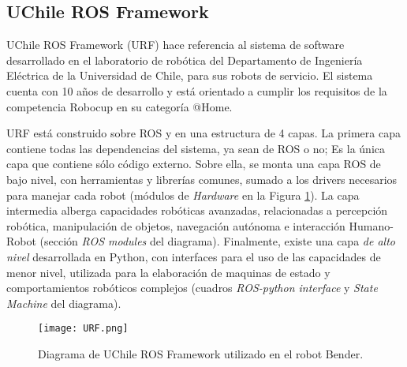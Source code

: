 \subsection{UChile ROS Framework}

UChile ROS Framework (URF) hace referencia al sistema de software desarrollado en el laboratorio de robótica del Departamento de Ingeniería Eléctrica de la Universidad de Chile, para sus robots de servicio. El sistema cuenta con 10 años de desarrollo y está orientado a cumplir los requisitos de la competencia Robocup en su categoría @Home.

URF está construido sobre ROS y en una estructura de 4 capas. La primera capa contiene todas las dependencias del sistema, ya sean de ROS o no; Es la única capa que contiene sólo código externo. Sobre ella, se monta una capa ROS de bajo nivel, con herramientas y librerías comunes, sumado a los drivers necesarios para manejar cada robot (módulos de \textit{Hardware} en la Figura \ref{img:URF}). La capa intermedia alberga capacidades robóticas avanzadas, relacionadas a percepción robótica, manipulación de objetos, navegación autónoma e interacción Humano-Robot (sección \textit{ROS modules} del diagrama). Finalmente, existe una capa \textit{de alto nivel} desarrollada en Python, con interfaces para el uso de las capacidades de menor nivel, utilizada para la elaboración de maquinas de estado y comportamientos robóticos complejos (cuadros \textit{ROS-python interface} y \textit{State Machine} del diagrama).

\begin{figure}[!h]
	\centering
	\texttt{[image: URF.png]}
	\caption{\small Diagrama de UChile ROS Framework utilizado en el robot Bender.}
	\label{img:URF}
\end{figure}


